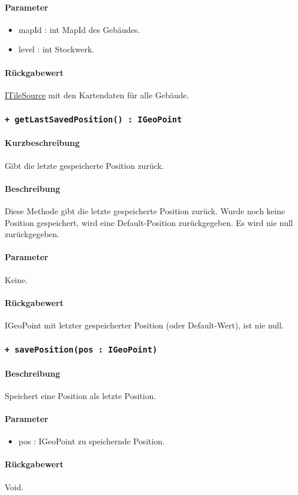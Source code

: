 \paragraph*{Parameter}
\begin{itemize}
    \item mapId : int MapId des Gebäudes.
    \item level : int Stockwerk.
\end{itemize}
\paragraph*{Rückgabewert}
\href{https://osmdroid.github.io/osmdroid/javadocAll/org/osmdroid/tileprovider/tilesource/ITileSource.html}
{ITileSource} mit den Kartendaten für alle Gebäude.

\subsubsection{\texttt{+ getLastSavedPosition() : IGeoPoint}}%
\paragraph*{Kurzbeschreibung}
Gibt die letzte gespeicherte Position zurück.
\paragraph*{Beschreibung}
Diese Methode gibt die letzte gespeicherte Position zurück. Wurde noch keine Position gespeichert,
wird eine Default-Position zurückgegeben. Es wird nie null zurückgegeben.
\paragraph*{Parameter}
Keine.
\paragraph*{Rückgabewert}
IGeoPoint mit letzter gespeicherter Position (oder Default-Wert), ist nie null.

\subsubsection{\texttt{+ savePosition(pos : IGeoPoint)}}%
\paragraph*{Beschreibung}
Speichert eine Position als letzte Position.
\paragraph*{Parameter}
\begin{itemize}
    \item pos : IGeoPoint zu speichernde Position.
\end{itemize}
\paragraph*{Rückgabewert}
Void.

